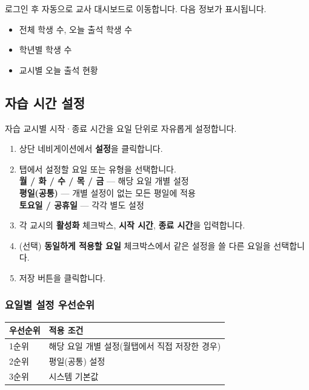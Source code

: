\documentclass[a4paper,12pt]{article}
\newcommand{\menu}[1]{\textcolor{primary}{\textbf{#1}}}
\begin{document}
로그인 후 자동으로 교사 대시보드로 이동합니다. 다음 정보가 표시됩니다.

\begin{itemize}[leftmargin=1.5em]
    \item 전체 학생 수, 오늘 출석 학생 수
    \item 학년별 학생 수
    \item 교시별 오늘 출석 현황
\end{itemize}

\subsection{자습 시간 설정}

자습 교시별 시작·종료 시간을 요일 단위로 자유롭게 설정합니다.

\begin{enumerate}[leftmargin=1.5em]
    \item 상단 네비게이션에서 \menu{설정}을 클릭합니다.
    \item 탭에서 설정할 요일 또는 유형을 선택합니다.\\
          \textbf{월 / 화 / 수 / 목 / 금} — 해당 요일 개별 설정\\
          \textbf{평일(공통)} — 개별 설정이 없는 모든 평일에 적용\\
          \textbf{토요일 / 공휴일} — 각각 별도 설정
    \item 각 교시의 \textbf{활성화} 체크박스, \textbf{시작 시간}, \textbf{종료 시간}을 입력합니다.
    \item (선택) \textbf{동일하게 적용할 요일} 체크박스에서 같은 설정을 쓸 다른 요일을 선택합니다.
    \item 저장 버튼을 클릭합니다.
\end{enumerate}

\subsubsection{요일별 설정 우선순위}

\begin{center}
\begin{tabular}{ll}
\toprule
\textbf{우선순위} & \textbf{적용 조건} \\
\midrule
1순위 & 해당 요일 개별 설정(월 탭에서 직접 저장한 경우) \\
2순위 & 평일(공통) 설정 \\
3순위 & 시스템 기본값 \\
\bottomrule
\end{tabular}
\end{center}
\end{document}
